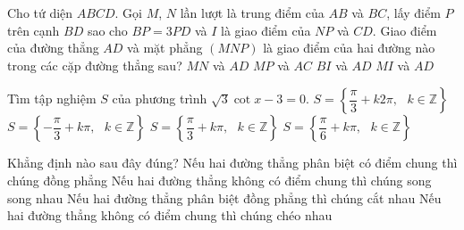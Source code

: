 \begin{ex}%
	Cho tứ diện $ABCD$. Gọi $M$, $N$ lần lượt là trung điểm của $AB$ và $BC$, lấy điểm $P$ trên cạnh $BD$ sao cho $BP=3PD$ và $I$ là giao điểm của $NP$ và $CD$. Giao điểm của đường thẳng $AD$ và mặt phẳng $(MNP)$ là giao điểm của hai đường nào trong các cặp đường thẳng sau?
	\choice
	{$MN$ và $AD$}
	{$MP$ và $AC$}
	{$BI$ và $AD$}
	{\True $MI$ và $AD$}
\end{ex}
\begin{ex}%
	Tìm tập nghiệm $S$ của phương trình $\sqrt{3}\cot x-3=0$.
	\choice
	{$S=\left\{ \dfrac{\pi}{3}+k2\pi ,\text{ } k\in \mathbb{Z} \right\}$}
	{$S=\left\{ -\dfrac{\pi}{3}+k\pi ,\text{ } k\in \mathbb{Z} \right\}$}
	{$S=\left\{ \dfrac{\pi}{3}+k\pi ,\text{ } k\in \mathbb{Z} \right\}$}
	{\True $S=\left\{ \dfrac{\pi}{6}+k\pi ,\text{ } k\in \mathbb{Z} \right\}$}
\end{ex}
\begin{ex}%
	Khẳng định nào sau đây đúng?
	\choice
	{\True Nếu hai đường thẳng phân biệt có điểm chung thì chúng đồng phẳng}
	{Nếu hai đường thẳng không có điểm chung thì chúng song song nhau}
	{Nếu hai đường thẳng phân biệt đồng phẳng thì chúng cắt nhau}
	{Nếu hai đường thẳng không có điểm chung thì chúng chéo nhau}
\end{ex}
